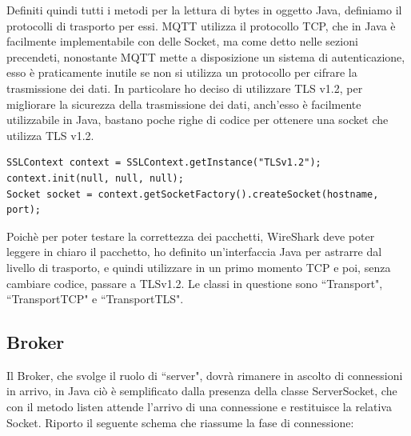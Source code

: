 \documentclass{article}
\begin{document}
Definiti quindi tutti i metodi per la lettura di bytes in oggetto Java, definiamo il protocolli di trasporto per essi. MQTT utilizza il protocollo TCP, che in Java è facilmente implementabile con delle Socket, ma come detto nelle sezioni precendeti, nonostante MQTT mette a disposizione un sistema di autenticazione, esso è praticamente inutile se non si utilizza un protocollo per cifrare la trasmissione dei dati. In particolare ho deciso di utilizzare TLS v1.2, per migliorare la sicurezza della trasmissione dei dati, anch'esso è facilmente utilizzabile in Java, bastano poche righe di codice per ottenere una socket che utilizza TLS v1.2.
\begin{lstlisting}[style=JavaStyle]
SSLContext context = SSLContext.getInstance("TLSv1.2");
context.init(null, null, null);
Socket socket = context.getSocketFactory().createSocket(hostname, port);
\end{lstlisting} 
Poichè per poter testare la correttezza dei pacchetti, WireShark deve poter leggere in chiaro il pacchetto, ho definito un'interfaccia Java per astrarre dal livello di trasporto, e quindi utilizzare in un primo momento TCP e poi, senza cambiare codice, passare a TLSv1.2. Le classi in questione sono ``Transport", ``TransportTCP" e ``TransportTLS".

\subsection{Broker}
Il Broker, che svolge il ruolo di ``server", dovrà rimanere in ascolto di connessioni in arrivo, in Java ciò è semplificato dalla presenza della classe ServerSocket, che con il metodo listen attende l'arrivo di una connessione e restituisce la relativa Socket. Riporto il seguente schema che riassume la fase di connessione:
\end{document}
